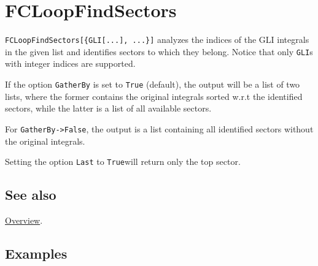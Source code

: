 \documentclass[../FeynCalcManual.tex]{subfiles}
\begin{document}
\begin{Shaded}
\begin{Highlighting}[]
 
\end{Highlighting}
\end{Shaded}

\hypertarget{fcloopfindsectors}{
\section{FCLoopFindSectors}\label{fcloopfindsectors}}

\texttt{FCLoopFindSectors[\allowbreak{}\{\allowbreak{}GLI[\allowbreak{}...],\ \allowbreak{}...\}]}
analyzes the indices of the GLI integrals in the given list and
identifies sectors to which they belong. Notice that only \texttt{GLI}s
with integer indices are supported.

If the option \texttt{GatherBy} is set to \texttt{True} (default), the
output will be a list of two lists, where the former contains the
original integrals sorted w.r.t the identified sectors, while the latter
is a list of all available sectors.

For \texttt{GatherBy->False}, the output is a list containing all
identified sectors without the original integrals.

Setting the option \texttt{Last} to \texttt{True}will return only the
top sector.

\subsection{See also}

\hyperlink{toc}{Overview}.

\subsection{Examples}

\begin{Shaded}
\begin{Highlighting}[]
\ExtensionTok{=} \OperatorTok{\{}
\OperatorTok{[}\OperatorTok{,} \OperatorTok{\{}\OperatorTok{,} \OperatorTok{,} \OperatorTok{,} \OperatorTok{\}],} 
\OperatorTok{[}\OperatorTok{,} \OperatorTok{\{}\OperatorTok{,} \OperatorTok{,} \OperatorTok{,} \OperatorTok{\}],} 
\OperatorTok{[}\OperatorTok{,} \OperatorTok{\{}\OperatorTok{,} \OperatorTok{,} \OperatorTok{,} \OperatorTok{\}],} 
\OperatorTok{[}\OperatorTok{,} \OperatorTok{\{}\OperatorTok{,} \OperatorTok{,} \OperatorTok{,} \SpecialCharTok{{-}}\OperatorTok{\}]} 
   \OperatorTok{\}}\NormalTok{;}
\end{Highlighting}
\end{Shaded}
\end{document}
